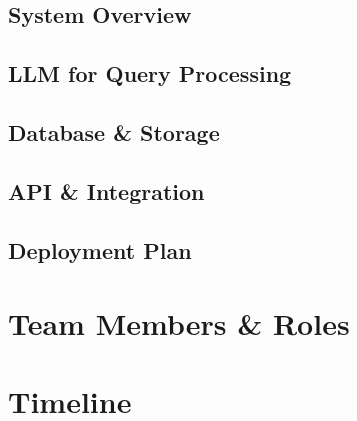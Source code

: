\documentclass{article}
\begin{document}
\subsection{System Overview}

\subsection{LLM for Query Processing}

\subsection{Database \& Storage}

\subsection{API \& Integration}

\subsection{Deployment Plan}

\section{Team Members \& Roles}

\section{Timeline}

\end{document}
